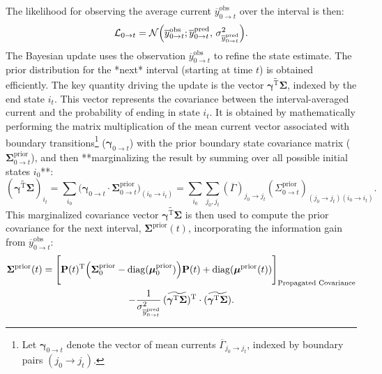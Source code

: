 \documentclass[9pt]{elife}
\begin{document}
	The likelihood for observing the average current \( \overline{y}^{\text{obs}}_{0 \rightarrow t} \) over the interval is then:
	\begin{equation}
		\mathcal{L}_{0 \rightarrow t} = \mathcal{N}\Bigl( \overline{y}^{\text{obs}}_{0 \rightarrow t} ; \overline{y}^{\text{pred}}_{0 \rightarrow t},\, \sigma^2_{\overline{y}^{\text{pred}}_{0 \rightarrow t}} \Bigr).
		\label{eq:macroIR_likelihood}
	\end{equation}
	The Bayesian update uses the observation \( \overline{y}^{\text{obs}}_{0 \rightarrow t} \) to refine the state estimate. The prior distribution for the *next* interval (starting at time \(t\)) is obtained efficiently. The key quantity driving the update is the vector \( \widetilde{\boldsymbol{\gamma}^{\mathrm{T}} \boldsymbol{\Sigma}} \), indexed by the end state \( i_t \). This vector represents the covariance between the interval-averaged current and the probability of ending in state \(i_t\). It is obtained by mathematically performing the matrix multiplication of the mean current vector associated with boundary transitions\footnote{Let \(\boldsymbol{\gamma}_{0 \rightarrow t}\) denote the vector of mean currents \( \overline{\Gamma}_{j_0 \rightarrow j_t} \), indexed by boundary pairs \((j_0 \rightarrow j_t)\).} (\(\boldsymbol{\gamma}_{0 \rightarrow t}\)) with the prior boundary state covariance matrix (\(\boldsymbol{\Sigma}^{\text{prior}}_{0 \rightarrow t}\)), and then **marginalizing the result by summing over all possible initial states \( i_0 \)**:
	\begin{equation}
		(\widetilde{\boldsymbol{\gamma}^{\mathrm{T}} \boldsymbol{\Sigma}})_{i_t} = \sum_{i_0} \Big( \boldsymbol{\gamma}_{0 \rightarrow t} \cdot \boldsymbol{\Sigma}^{\text{prior}}_{0 \rightarrow t} \Big)_{(i_0 \rightarrow i_t)} = \sum_{i_0} \sum_{j_0, j_t} (\overline{\Gamma})_{j_0 \rightarrow j_t} (\Sigma^{\text{prior}}_{0 \rightarrow t})_{(j_0 \rightarrow j_t)(i_0 \rightarrow i_t)}. 
		\label{eq:interval_gamma_sigma_explained} %
	\end{equation}
	This marginalized covariance vector \( \widetilde{\boldsymbol{\gamma}^{\mathrm{T}} \boldsymbol{\Sigma}} \) is then used to compute the prior covariance for the next interval, \( \boldsymbol{\Sigma}^{\text{prior}}(t) \), incorporating the information gain from \( \overline{y}^{\text{obs}}_{0 \rightarrow t} \):
	\begin{multline}
		\boldsymbol{\Sigma}^{\text{prior}}(t) = \Biggl[ \mathbf{P}(t)^{\mathrm{T}} \Bigl( \boldsymbol{\Sigma}^{\text{prior}}_{0} - \mathrm{diag}(\boldsymbol{\mu}^{\text{prior}}_{0}) \Bigr) \mathbf{P}(t) + \mathrm{diag}(\boldsymbol{\mu}^{\text{prior}}(t)) \Biggr]_{\text{Propagated Covariance}} \\ 
		- \frac{1}{\sigma^2_{\overline{y}^{\text{pred}}_{0 \rightarrow t}}} \, (\widetilde{\boldsymbol{\gamma}^{\mathrm{T}} \boldsymbol{\Sigma}})^{\mathrm{T}} \cdot (\widetilde{\boldsymbol{\gamma}^{\mathrm{T}} \boldsymbol{\Sigma}}). 
		\label{eq:prior_covariance_update_0_t} %
	\end{multline}
\end{document}
